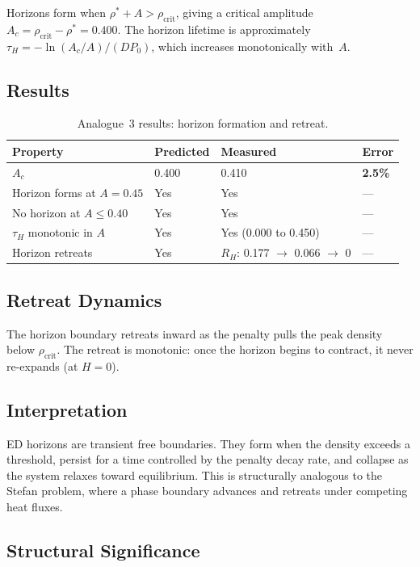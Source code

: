 \documentclass[11pt]{article}
\begin{document}
Horizons form when \(\rho^* + A > \rho_{\mathrm{crit}}\), giving a critical amplitude \(A_c = \rho_{\mathrm{crit}} - \rho^* = 0.400\). The horizon lifetime is approximately \(\tau_H = -\ln(A_c/A)/(DP_0)\), which increases monotonically with~\(A\).

\subsection{Results}

\begin{table}[h]
\centering
\begin{tabular}{@{}llll@{}}
\toprule
Property & Predicted & Measured & Error \\
\midrule
\(A_c\) & 0.400 & 0.410 & \textbf{2.5\%} \\
Horizon forms at \(A = 0.45\) & Yes & Yes & --- \\
No horizon at \(A \leq 0.40\) & Yes & Yes & --- \\
\(\tau_H\) monotonic in \(A\) & Yes & Yes (0.000 to 0.450) & --- \\
Horizon retreats & Yes & \(R_H\): 0.177 \(\to\) 0.066 \(\to\) 0 & --- \\
\bottomrule
\end{tabular}
\caption{Analogue~3 results: horizon formation and retreat.}
\label{tab:horizon-results}
\end{table}

\subsection{Retreat Dynamics}

The horizon boundary retreats inward as the penalty pulls the peak density below \(\rho_{\mathrm{crit}}\). The retreat is monotonic: once the horizon begins to contract, it never re-expands (at \(H = 0\)).

\subsection{Interpretation}

ED horizons are transient free boundaries. They form when the density exceeds a threshold, persist for a time controlled by the penalty decay rate, and collapse as the system relaxes toward equilibrium. This is structurally analogous to the Stefan problem, where a phase boundary advances and retreats under competing heat fluxes.

\subsection{Structural Significance}
\end{document}
